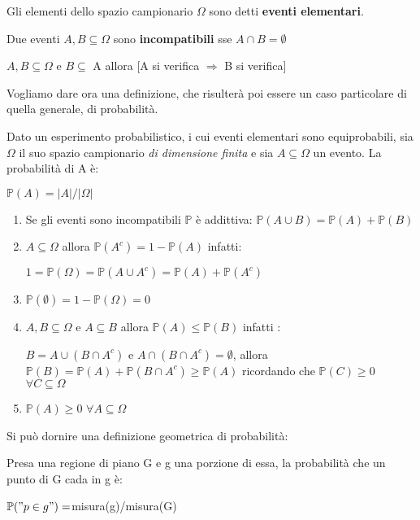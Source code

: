\begin{definition}
Gli elementi dello spazio campionario \(\Omega\) sono detti \textbf{eventi elementari}.
\end{definition}
\begin{definition}
Due eventi \(A,B\subseteq\Omega\) sono \textbf{incompatibili} sse \(A\cap B=\emptyset\)
\end{definition}

\begin{observation}
\(A,B\subseteq\Omega\) e \(B\subseteq\) A allora [A si verifica \(  \Rightarrow\) B si verifica]
\end{observation}

Vogliamo dare ora una definizione, che risulterà poi essere un caso particolare di quella generale, di probabilità.
\begin{definition}
Dato un esperimento probabilistico, i cui eventi elementari sono equiprobabili, sia \(\Omega\) il suo spazio campionario \textit{di dimensione finita} e sia \(A\subseteq\Omega\) un evento. La probabilità di A è:
\begin{center}
\(\mathbb{P}(A)=|A|/|\Omega|\)
\end{center}
\end{definition}
\newpage
\begin{observation}
\label{obs.1.2}
\begin{enumerate}
    \item Se gli eventi sono incompatibili \(\mathbb{P}\) è addittiva:  \(\mathbb{P}(A\cup B)=\mathbb{P}(A)+\mathbb{P}(B)\)
    \item \(A\subseteq\Omega\) allora \(\mathbb{P}(A^c)=1-\mathbb{P}(A)\) infatti:
    \begin{center}
        \(1=\mathbb{P}(\Omega)=\mathbb{P}(A\cup A^c)=\mathbb{P}(A)+\mathbb{P}(A^c)\)
    \end{center}
    \item \(\mathbb{P}(\emptyset)=1-\mathbb{P}(\Omega)=0\)
    \item \(A,B\subseteq\Omega\) e \(A\subseteq B\) allora \(\mathbb{P}(A)\leq\mathbb{P}(B)\) infatti :
    \begin{center}
        \(B=A\cup (B\cap A^c)\) e \(A\cap (B\cap A^c)=\emptyset\), allora \(\mathbb{P}(B)=\mathbb{P}(A)+\mathbb{P}(B\cap A^c)\geq\mathbb{P}(A)\) ricordando che \(\mathbb{P}(C)\geq0\) \(\forall C\subseteq\Omega\)
    \end{center}
    \item \(\mathbb{P}(A)\geq0\) \(\forall A\subseteq\Omega\)
\end{enumerate}
\end{observation}
\vspace{30px}
Si può dornire una definizione geometrica di probabilità:

Presa una regione di piano G e g una porzione di essa, la probabilità che un punto di G cada in g è: 
\begin{center}
    \(\mathbb{P}("p\in g")=\)misura(g)/misura(G)
\end{center}
